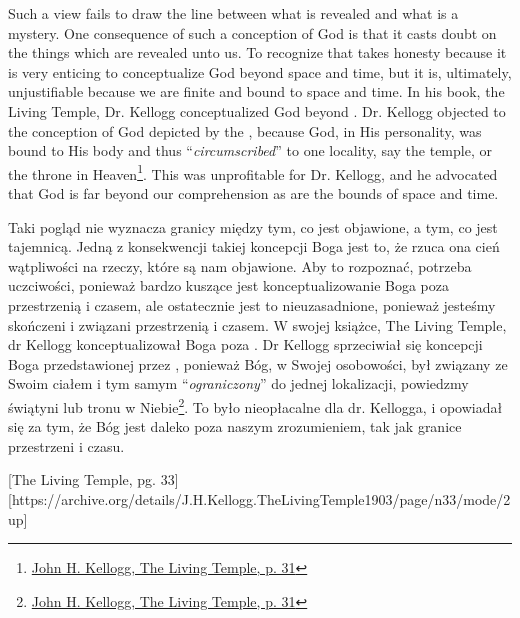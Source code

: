 Such a view fails to draw the line between what is revealed and what is a mystery. One consequence of such a conception of God is that it casts doubt on the things which are revealed unto us. To recognize that takes honesty because it is very enticing to conceptualize God beyond space and time, but it is, ultimately, unjustifiable because we are finite and bound to space and time. In his book, the Living Temple, Dr. Kellogg conceptualized God beyond . Dr. Kellogg objected to the conception of God depicted by the , because God, in His personality, was bound to His body and thus “\textit{circumscribed}” to one locality, say the temple, or the throne in Heaven\footnote{\href{https://archive.org/details/J.H.Kellogg.TheLivingTemple1903/page/n31/mode/2up}{John H. Kellogg, The Living Temple, p. 31}}. This was unprofitable for Dr. Kellogg, and he advocated that God is far beyond our comprehension as are the bounds of space and time.


Taki pogląd nie wyznacza granicy między tym, co jest objawione, a tym, co jest tajemnicą. Jedną z konsekwencji takiej koncepcji Boga jest to, że rzuca ona cień wątpliwości na rzeczy, które są nam objawione. Aby to rozpoznać, potrzeba uczciwości, ponieważ bardzo kuszące jest konceptualizowanie Boga poza przestrzenią i czasem, ale ostatecznie jest to nieuzasadnione, ponieważ jesteśmy skończeni i związani przestrzenią i czasem. W swojej książce, The Living Temple, dr Kellogg konceptualizował Boga poza . Dr Kellogg sprzeciwiał się koncepcji Boga przedstawionej przez , ponieważ Bóg, w Swojej osobowości, był związany ze Swoim ciałem i tym samym “\textit{ograniczony}” do jednej lokalizacji, powiedzmy świątyni lub tronu w Niebie\footnote{\href{https://archive.org/details/J.H.Kellogg.TheLivingTemple1903/page/n31/mode/2up}{John H. Kellogg, The Living Temple, p. 31}}. To było nieopłacalne dla dr. Kellogga, i opowiadał się za tym, że Bóg jest daleko poza naszym zrozumieniem, tak jak granice przestrzeni i czasu.


[The Living Temple, pg. 33][https://archive.org/details/J.H.Kellogg.TheLivingTemple1903/page/n33/mode/2up]


